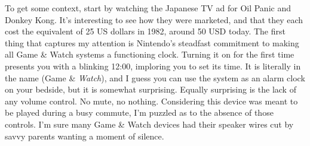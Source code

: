 \documentclass{book}
\begin{document}
\FloatBarrier\vspace{\baselineskip}\centering
\begin{minipage}{0.45\linewidth}\captionsetup{labelformat=empty}\end{minipage}\vspace{2pt}
\begin{minipage}{0.45\linewidth}\captionsetup{labelformat=empty}\end{minipage}\vspace{2pt}
\begin{minipage}{0.45\linewidth}\captionsetup{labelformat=empty}\end{minipage}\vspace{2pt}
\begin{minipage}{0.45\linewidth}\captionsetup{labelformat=empty}\end{minipage}\vspace{2pt}
\begin{minipage}{0.45\linewidth}\captionsetup{labelformat=empty}\end{minipage}
\par\justifying
To get some context, start by watching the Japanese TV ad for Oil Panic and Donkey Kong. It’s interesting to see how they were marketed, and that they each cost the equivalent of 25 US dollars in 1982, around 50 USD today. The first thing that captures my attention is Nintendo’s steadfast commitment to making all Game \& Watch systems a functioning clock. Turning it on for the first time presents you with a blinking 12:00, imploring you to set its time. It is literally in the name (Game \& \emph{Watch}), and I guess you can use the system as an alarm clock on your bedside, but it is somewhat surprising. Equally surprising is the lack of any volume control. No mute, no nothing. Considering this device was meant to be played during a busy commute, I’m puzzled as to the absence of those controls. I’m sure many Game \& Watch devices had their speaker wires cut by savvy parents wanting a moment of silence.\par
\end{document}
